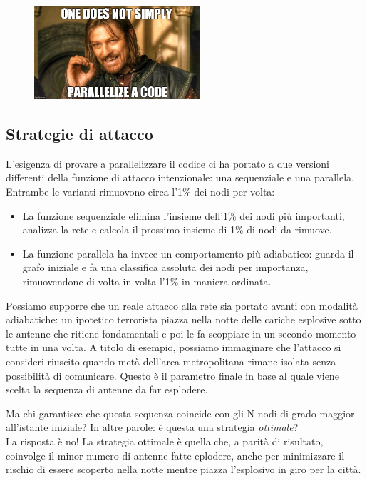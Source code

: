 \begin{figure}[h!]
	\centering
	\includegraphics[width=0.55\textwidth]{./Immagini/Attack/meme_Boromir.jpg}
\end{figure}

\subsection{Strategie di attacco}
\label{subsec:atakstrat}
L'esigenza di provare a parallelizzare il codice ci ha portato a due versioni differenti della funzione di attacco intenzionale: una sequenziale e una parallela. Entrambe le varianti rimuovono circa l'1\% dei nodi per volta: 

\begin{itemize}
 \item La funzione sequenziale elimina l'insieme dell'1\% dei nodi più importanti, analizza la rete e calcola il prossimo insieme di 1\% di nodi da rimuove.
 \item La funzione parallela ha invece un comportamento più adiabatico: guarda il grafo iniziale e fa una classifica assoluta dei nodi per importanza, rimuovendone di volta in volta l'1\% in maniera ordinata.
\end{itemize}

Possiamo supporre che un reale attacco alla rete sia portato avanti con modalità adiabatiche: un ipotetico terrorista piazza nella notte delle cariche esplosive sotto le antenne che ritiene fondamentali e poi le fa scoppiare in un secondo momento tutte in una volta. A titolo di esempio, possiamo immaginare che l'attacco si consideri riuscito quando metà dell'area metropolitana rimane isolata senza possibilità di comunicare. Questo è il parametro finale in base al quale viene scelta la sequenza di antenne da far esplodere.

Ma chi garantisce che questa sequenza coincide con gli N nodi di grado maggior all'istante iniziale? In altre parole: è questa una strategia \emph{ottimale}?\\
La risposta è no! La strategia ottimale è quella che, a parità di risultato, coinvolge il minor numero di antenne fatte eplodere, anche per minimizzare il rischio di essere scoperto nella notte mentre piazza l'esplosivo in giro per la città.

